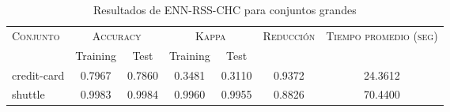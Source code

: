 \begin{table}[]
\centering
\begin{tabular}{l c c c c c c}
\hline
\multirow{2}{*}{\textsc{Conjunto}}
	& \multicolumn{2}{c}{\textsc{Accuracy}}
	& \multicolumn{2}{c}{\textsc{Kappa}}
	& \textsc{Reducción}
	& \textsc{Tiempo promedio (seg)} \\
	& Training & Test
	& Training & Test \\ 
\hline
\hline

credit-card & 0.7967 & 0.7860 & 0.3481 & 0.3110 & 0.9372 & 24.3612 \\
shuttle & 0.9983 & 0.9984 & 0.9960 & 0.9955 & 0.8826 & 70.4400 \\

\hline
\end{tabular}
\caption{Resultados de ENN-RSS-CHC para conjuntos grandes }
\label{res-grande-ENN-RSS-CHC}
\end{table}